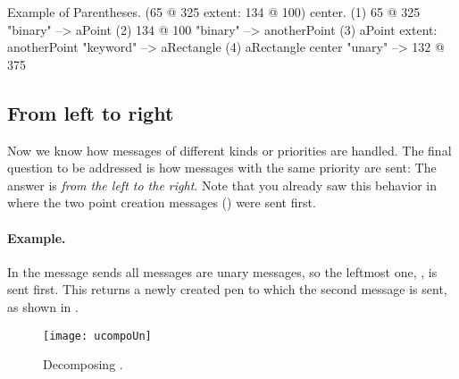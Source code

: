 \documentclass[a4paper,10pt,twoside]{book}
\begin{document}
\begin{example}[decExtent]{Example of Parentheses.}{}
      (65 @ 325 extent: 134 @ 100) center.
(1)   65 @ 325                                                    "binary"
    --> aPoint
(2)                                  134 @ 100                     "binary"
                                 --> anotherPoint
(3)   aPoint extent: anotherPoint                       "keyword"
      --> aRectangle
(4)   aRectangle center                                     "unary"
      --> 132 @ 375
\end{example}

\subsection{From left to right}
Now we know how messages of different kinds or priorities are handled.
The final question to be addressed is how messages with the same priority are sent:
The answer is \emph{from the left to the right}. Note that you already saw this behavior in  where the two point creation messages () were sent first.



\paragraph{Example.}
In the message sends  all messages are unary messages, so the leftmost one, , is sent first.
This returns a newly created pen to which the second message  is sent, as shown in .

\begin{figure}
	\centering
	\texttt{[image: ucompoUn]}
	\caption{Decomposing .\label{fig:unaryMessages}}
\end{figure}

\end{document}
